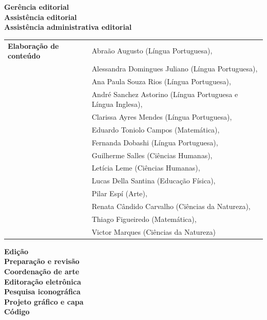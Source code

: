 \newcommand{\linha}[2]{\ifdef{#2}{\linhalayout{#1}{#2}}{}}

\begingroup\tiny
\parindent=0cm
\thispagestyle{empty}

\textbf{Gerência editorial}\\
\textbf{Assistência editorial}\\
\textbf{Assistência administrativa editorial}\\

\hspace{-5pt}\begin{tabular}{ll}
\textbf{Elaboração de conteúdo} & Abraão Augusto (Língua Portuguesa),	\\
								& Alessandra Domingues Juliano (Língua Portuguesa),	\\
								& Ana Paula Souza Rios (Língua Portuguesa),	\\
								& André Sanchez Astorino (Língua Portuguesa e Língua Inglesa),	\\
								& Clarissa Ayres Mendes (Língua Portuguesa),	\\
								& Eduardo Toniolo Campos (Matemática),	\\
								& Fernanda Dobashi (Língua Portuguesa),	\\
								& Guilherme Salles (Ciências Humanas),	\\
								& Letícia Leme (Ciências Humanas),	\\
								& Lucas Della Santina (Educação Física),	\\
								& Pilar Espí (Arte),	\\
								& Renata Cândido Carvalho (Ciências da Natureza),	\\
								& Thiago Figueiredo (Matemática),	\\
								& Victor Marques (Ciências da Natureza)	\\
\end{tabular}


\textbf{Edição}\\
\textbf{Preparação e revisão}\\
\textbf{Coordenação de arte}\\
\textbf{Editoração eletrônica}\\
\textbf{Pesquisa iconográfica}\\
\textbf{Projeto gráfico e capa}\\
\textbf{Código}

